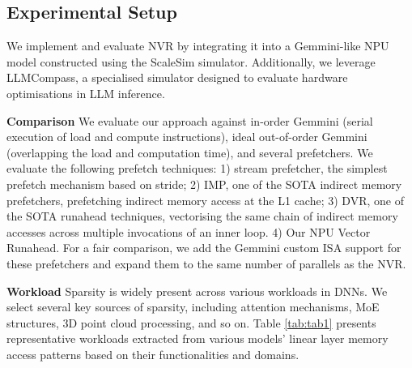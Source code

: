 



\vspace{-5pt}
\subsection{Experimental Setup}
\vspace{-3pt}
We implement and evaluate NVR by integrating it into a Gemmini-like NPU model constructed using the ScaleSim simulator\cite{scalesim}. 
Additionally, we leverage LLMCompass\cite{llmcompass}, a specialised simulator designed to evaluate hardware optimisations in LLM inference.%

\noindent \textbf{Comparison}
We evaluate our approach against in-order Gemmini (serial execution of load and compute instructions), ideal out-of-order Gemmini (overlapping the load and computation time), and several prefetchers.
We evaluate the following prefetch techniques:
1) stream prefetcher\cite{stream}, the simplest prefetch mechanism based on stride;
2) IMP\cite{imp}, one of the SOTA indirect memory prefetchers, prefetching indirect memory access at the L1 cache;
3) DVR\cite{8DVR}, one of the SOTA runahead techniques, vectorising the same chain of indirect memory accesses across multiple invocations of an inner loop.
4) Our NPU Vector Runahead. 
For a fair comparison, we add the Gemmini custom ISA support for these prefetchers and expand them to the same number of parallels as the NVR. 

\noindent \textbf{Workload}
Sparsity is widely present across various workloads in DNNs. 
We select several key sources of sparsity, including attention mechanisms\cite{attention, sparseattention}, MoE structures\cite{MoE, glam}, 3D point cloud processing\cite{3Dpoint, dgcnn}, and so on. 
Table \ref{tab:tab1} presents representative workloads extracted from various models' linear layer memory access patterns based on their functionalities and domains.


